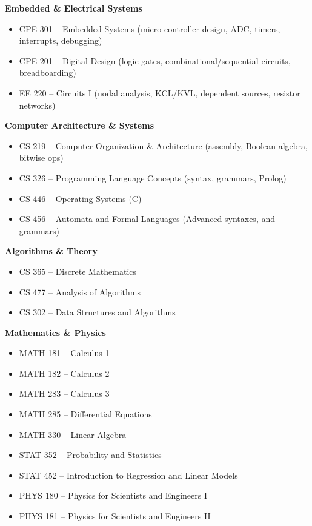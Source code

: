 \documentclass[10pt]{article}
\begin{document}
\textbf{Embedded \& Electrical Systems}
    \begin{itemize}
        \item CPE 301 -- Embedded Systems (micro-controller design, ADC, timers, interrupts, debugging)
        \item CPE 201 -- Digital Design (logic gates, combinational/sequential circuits, breadboarding)
        \item EE 220 -- Circuits I (nodal analysis, KCL/KVL, dependent sources, resistor networks)
    \end{itemize}

\textbf{Computer Architecture \& Systems}
    \begin{itemize}
        \item CS 219 -- Computer Organization \& Architecture (assembly, Boolean algebra, bitwise ops)
        \item CS 326 -- Programming Language Concepts (syntax, grammars, Prolog)
        \item CS 446 -- Operating Systems (C) 
        \item CS 456 -- Automata and Formal Languages (Advanced syntaxes, and grammars)
    \end{itemize}

\textbf{Algorithms \& Theory}
    \begin{itemize}
        \item CS 365 -- Discrete Mathematics
        \item CS 477 -- Analysis of Algorithms
        \item CS 302 -- Data Structures and Algorithms
    \end{itemize}

\textbf{Mathematics \& Physics}
    \begin{itemize}
        \item MATH 181 -- Calculus 1
        \item MATH 182 -- Calculus 2
        \item MATH 283 -- Calculus 3
        \item MATH 285 -- Differential Equations
        \item MATH 330 -- Linear Algebra
        \item STAT 352 -- Probability and Statistics
        \item STAT 452 -- Introduction to Regression and Linear Models 
        \item PHYS 180 -- Physics for Scientists and Engineers I
        \item PHYS 181 -- Physics for Scientists and Engineers II
    \end{itemize}
\end{document}
